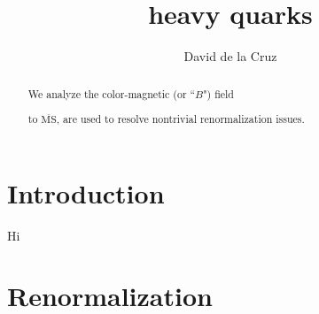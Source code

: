\documentclass[floatfix,twocolumn,prd,showpacs,preprintnumbers,amsmath,nofootinbib,amssymb,superscriptaddress]{revtex4-2}
\begin{document}

\title{
heavy quarks
}

\author{David de la Cruz}


\def\d{\mathrm{d}}

\def\luisnote#1{\textcolor{red}{\textbf{Luis:  #1}}}

\def\muphys{\bar{\mu}_B} 
\def\mubar{\bar{\mu}} %

\def\GE{G_E}
\def\GB{G_B} %
 
\def\Zmatch{Z_{\mathrm{match}}} %

\begin{abstract}
We analyze the color-magnetic (or ``$B$") field 

 to $\overline{\text{MS}}$, are used to resolve nontrivial renormalization issues. 

\end{abstract}

\maketitle


\section{Introduction}

Hi


\section{Renormalization}
\label{sec:renorm}
\end{document}
